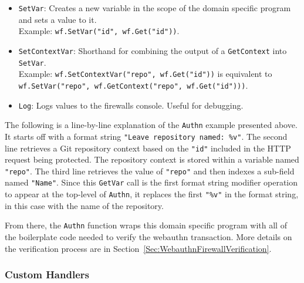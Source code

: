 \begin{itemize}[nosep]
\item \lstinline{SetVar}: Creates a new variable in the scope of the domain specific program and sets a value to it. \\Example: \lstinline{wf.SetVar("id", wf.Get("id"))}.

\item \lstinline{SetContextVar}: Shorthand for combining the output of a \lstinline{GetContext} into \lstinline{SetVar}. \\Example: \lstinline{wf.SetContextVar("repo", wf.Get("id"))} is equivalent to \\ \lstinline{wf.SetVar("repo", wf.GetContext("repo", wf.Get("id")))}.

\item \lstinline{Log}: Logs values to the firewalls console. Useful for debugging. 

\end{itemize}

\noindent The following is a line-by-line explanation of the \lstinline{Authn} example presented above. It starts off with a format string \lstinline{"Leave repository named: %v"}. The second line retrieves a Git repository context based on the \lstinline{"id"} included in the HTTP request being protected. The repository context is stored within a variable named \lstinline{"repo"}. The third line retrieves the value of \lstinline{"repo"} and then indexes a sub-field named \lstinline{"Name"}. Since this \lstinline{GetVar} call is the first format string modifier operation to appear at the top-level of \lstinline{Authn}, it replaces the first \lstinline{"%v"} in the format string, in this case with the name of the repository.

From there, the \lstinline{Authn} function wraps this domain specific program with all of the boilerplate code needed to verify the webauthn transaction. More details on the verification process are in Section~\ref{Sec:WebauthnFirewallVerification}.

\iffalse
 It happens to be a structure, so the name of the repository is  
. It indexes further into the struct to get the

affects the format string

\fi

\subsubsection{Custom Handlers}\label{Sec:CustomHandlers}

